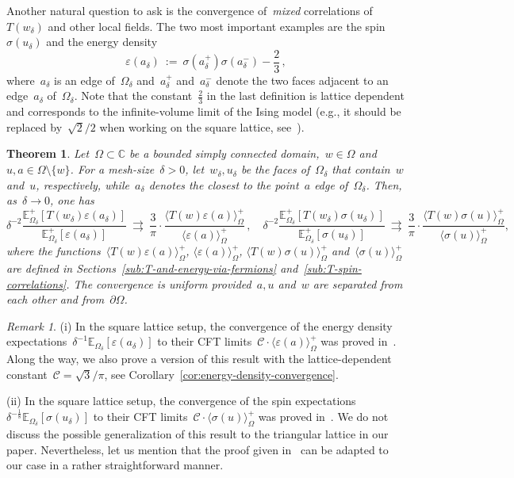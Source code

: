 \documentclass[reqno,11pt,a4paper]{amsart}
\newtheorem{theorem}{Theorem}
\theoremstyle{remark}
\newtheorem{remark}[proposition]{Remark}
\newcommand{\C}{\mathbb{C}}
\newcommand{\Edelta}{\mathbb{E}_{\Omega_\delta}}
\newcommand\Corr[1]{\langle #1 \rangle}
\newcommand\CorrO[2][+]{\Corr{#2}_\Omega^{#1}}
\begin{document}
Another natural question to ask is the convergence of~\emph{mixed} correlations of~$T(w_\delta)$ and other local fields. The two most important examples are the spin~$\sigma(u_\delta)$ and the energy density
\[
\varepsilon(a_\delta)~:=~\sigma(a^+_\delta)\sigma(a^-_\delta)-\textstyle{\frac{2}{3}}\,,
\]
where~$a_\delta$ is an edge of~$\Omega_\delta$ and~$a^+_\delta$ and~$a^-_\delta$ denote the two faces adjacent to an edge~$a_\delta$ of~$\Omega_\delta$. 
Note that the constant~$\tfrac{2}{3}$ in the last definition is lattice dependent and corresponds to the infinite-volume limit of the Ising model (e.g., it should be replaced by~$\sqrt{2}/2$ when working on the square lattice, see~\cite{HonSmi13}). %

\begin{theorem}\label{thm:Ising3}
	Let~$\Omega\subset\C$ be a bounded simply connected domain,~$w\in\Omega$ and $u,a\in\Omega\setminus\{w\}$. 
	For a mesh-size~$\delta>0$, let~$w_\delta,u_\delta$ be the faces of~$\Omega_\delta$ that contain~$w$ and~$u$, respectively, while~$a_\delta$ denotes the closest to the point~$a$ edge of~$\Omega_\delta$. 
	Then, as~$\delta \to 0$, one has
	\[
		\delta^{-2}\frac{\Edelta^+[T(w_\delta)\varepsilon(a_\delta)]}{\Edelta^+[\varepsilon(a_\delta)]}~\rightrightarrows~\frac{3}{\pi}\cdot \frac{\CorrO{T(w)\varepsilon(a)}}{\CorrO{\varepsilon(a)}}\,,\quad
		\delta^{-2}\frac{\Edelta^+[T(w_\delta)\sigma(u_\delta)]}{\Edelta^+[\sigma(u_\delta)]}~\rightrightarrows~\frac{3}{\pi}\cdot \frac{\CorrO{T(w)\sigma(u)}}{\CorrO{\sigma(u)}},
	\]
where the functions~$\CorrO{T(w)\varepsilon(a)}$, $\CorrO{\varepsilon(a)}$, $\CorrO{T(w)\sigma(u)}$ and~$\CorrO{\sigma(u)}$ are defined in Sections~\ref{sub:T-and-energy-via-fermions} and~\ref{sub:T-spin-correlations}. The convergence is uniform provided~$a,u$ and~$w$ are separated from each other and from~$\partial\Omega$.
\end{theorem}

\begin{remark} (i) In the square lattice setup, the convergence of the energy density expectations~$\delta^{-1}\Edelta[\varepsilon(a_\delta)]$ to their CFT limits~$\mathcal{C}\cdot \CorrO{\varepsilon(a)}$ was proved in~\cite{HonSmi13}. Along the way, we also prove a version of this result with the lattice-dependent constant~$\mathcal{C}=\sqrt{3}/\pi$, see Corollary~\ref{cor:energy-density-convergence}.

\noindent (ii) In the square lattice setup, the convergence of the spin expectations~$\delta^{-\frac{1}{8}}\Edelta[\sigma(u_\delta)]$ to their CFT limits~$\mathcal{C}\cdot\CorrO{\sigma(u)}$ was proved in~\cite{CheHonIzy15}. We do not discuss the possible generalization of this result to the triangular lattice in our paper.
Nevertheless, let us mention that the proof given in~\cite{CheHonIzy15} can be adapted to our case in a rather straightforward manner.
\end{remark}
\end{document}
